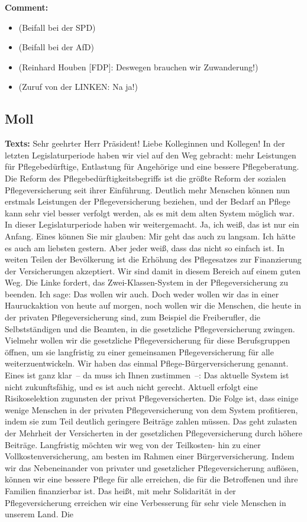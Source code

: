 \documentclass{article}
\begin{document}
\noindent\textbf{Comment:}
\begin{itemize}
    \setlength\itemsep{-3pt}
    \item (Beifall bei der SPD)
    \setlength\itemsep{-3pt}
    \item (Beifall bei der AfD)
    \setlength\itemsep{-3pt}
    \item (Reinhard Houben [FDP]: Deswegen brauchen wir Zuwanderung!)
    \setlength\itemsep{-3pt}
    \item (Zuruf von der LINKEN: Na ja!)
\end{itemize}
\subsection{Moll}
\noindent\textbf{Texts:} Sehr geehrter Herr Präsident! Liebe Kolleginnen und Kollegen! In der letzten Legislaturperiode haben wir viel auf den Weg gebracht: mehr Leistungen für Pflegebedürftige, Entlastung für Angehörige und eine bessere Pflegeberatung. Die Reform des Pflegebedürftigkeitsbegriffs ist die größte Reform der sozialen Pflegeversicherung seit ihrer Einführung. Deutlich mehr Menschen können nun erstmals Leistungen der Pflegeversicherung beziehen, und der Bedarf an Pflege kann sehr viel besser verfolgt werden, als es mit dem alten System möglich war.  In dieser Legislaturperiode haben wir weitergemacht. Ja, ich weiß, das ist nur ein Anfang. Eines können Sie mir glauben: Mir geht das auch zu langsam. Ich hätte es auch am liebsten gestern. Aber jeder weiß, dass das nicht so einfach ist. In weiten Teilen der Bevölkerung ist die Erhöhung des Pflegesatzes zur Finanzierung der Versicherungen akzeptiert. Wir sind damit in diesem Bereich auf einem guten Weg. Die Linke fordert, das Zwei-Klassen-System in der Pflegeversicherung zu beenden. Ich sage: Das wollen wir auch.  Doch weder wollen wir das in einer Hauruckaktion von heute auf morgen,  noch wollen wir die Menschen, die heute in der privaten Pflegeversicherung sind, zum Beispiel die Freiberufler, die Selbstständigen und die Beamten, in die gesetzliche Pflegeversicherung zwingen. Vielmehr wollen wir die gesetzliche Pflegeversicherung für diese Berufsgruppen öffnen, um sie langfristig zu einer gemeinsamen Pflegeversicherung für alle weiterzuentwickeln. Wir haben das einmal Pflege-Bürgerversicherung genannt. Eines ist ganz klar – da muss ich Ihnen zustimmen –: Das aktuelle System ist nicht zukunftsfähig, und es ist auch nicht gerecht. Aktuell erfolgt eine Risikoselektion zugunsten der privat Pflegeversicherten. Die Folge ist, dass einige wenige Menschen in der privaten Pflegeversicherung von dem System profitieren, indem sie zum Teil deutlich geringere Beiträge zahlen müssen. Das geht zulasten der Mehrheit der Versicherten in der gesetzlichen Pflegeversicherung durch höhere Beiträge. Langfristig möchten wir weg von der Teilkosten- hin zu einer Vollkostenversicherung, am besten im Rahmen einer Bürgerversicherung. Indem wir das Nebeneinander von privater und gesetzlicher Pflegeversicherung auflösen, können wir eine bessere Pflege für alle erreichen,  die für die Betroffenen und ihre Familien finanzierbar ist. Das heißt, mit mehr Solidarität in der Pflegeversicherung erreichen wir eine Verbesserung für sehr viele Menschen in unserem Land. Die 
\end{document}
